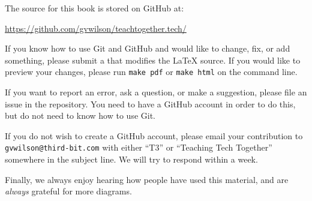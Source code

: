 The source for this book is stored on GitHub at:

\begin{center}
  \url{https://github.com/gvwilson/teachtogether.tech/}
\end{center}

\noindent
If you know how to use Git and GitHub and would like to change, fix, or add something,
please submit a  that modifies the LaTeX source.
If you would like to preview your changes,
please run \texttt{make~pdf} or \texttt{make~html} on the command line.

If you want to report an error,
ask a question,
or make a suggestion,
please file an issue in the repository.
You need to have a GitHub account in order to do this,
but do not need to know how to use Git.

If you do not wish to create a GitHub account,
please email your contribution to \texttt{gvwilson@third-bit.com}
with either ``T3'' or ``Teaching Tech Together'' somewhere in the subject line.
We will try to respond within a week.

Finally,
we always enjoy hearing how people have used this material,
and are \emph{always} grateful for more diagrams.
